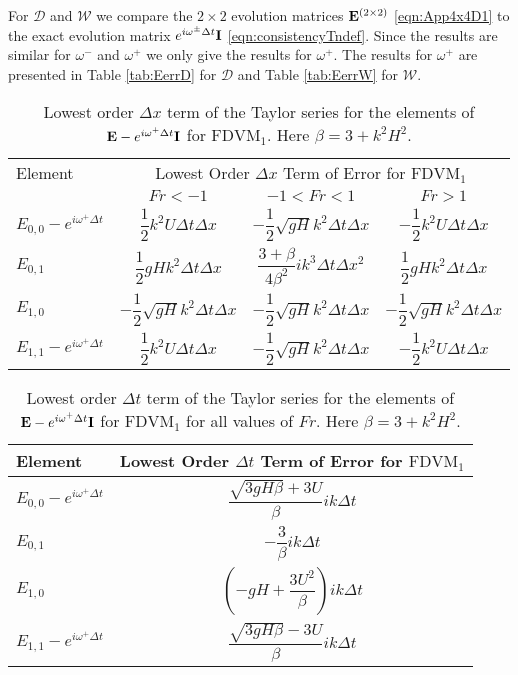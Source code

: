 For $\mathcal{D}$ and $\mathcal{W}$ we compare the $2\times 2$ evolution matrices $\mathbf{E}^{\left(2\times 2\right)}$ \eqref{eqn:App4x4D1} to the exact evolution matrix $e^{i\omega^\pm \Delta t } \mathbf{I}$ \eqref{eqn:consistencyTndef}. Since the results are similar for $\omega^-$ and $\omega^+$ we only give the results for $\omega^+$. The results for $\omega^+$ are presented in Table \ref{tab:EerrD} for $\mathcal{D}$ and Table \ref{tab:EerrW} for $\mathcal{W}$.

\begin{table}
	\centering
	\begin{tabular}{l c c c}
		\hline
		Element & \multicolumn{3}{c}{Lowest Order $\Delta x$ Term of Error for $\text{FDVM}_1$} \T \B \\ 
		\cline{2-4}
		& $Fr < -1$  & $-1 < Fr < 1$ & $Fr > 1$ \T \B \\ 
		\hline
		$E_{0,0} -  e^{i \omega^+ \Delta t} $& $ \dfrac{1}{2} k^2 U \Delta t \Delta x$& $ - \dfrac{1}{2} \sqrt{gH} k^2 \Delta t\Delta x$ &  $- \dfrac{1}{2} k^2 U \Delta t \Delta x$  \T \B \\
		$E_{0,1}$& $\dfrac{1}{2}gHk^2 \Delta t \Delta x $  &$ \dfrac{3 + \beta}{4 \beta^2}i k^3\Delta  t\Delta x^2$ & $\dfrac{1}{2}gHk^2 \Delta t \Delta x $ \T \B   \\
		$E_{1,0}$& $ - \dfrac{1}{2} \sqrt{gH} k^2 \Delta t\Delta x$  &$ - \dfrac{1}{2} \sqrt{gH} k^2 \Delta t\Delta x$ & $ - \dfrac{1}{2} \sqrt{gH} k^2 \Delta t\Delta x$ \T \B  \\
		$E_{1,1} -  e^{i \omega^+ \Delta t}$& $ \dfrac{1}{2} k^2 U \Delta t \Delta x$  &$ - \dfrac{1}{2} \sqrt{gH} k^2 \Delta t\Delta x$ & $- \dfrac{1}{2} k^2 U \Delta t \Delta x$  \T\B  \\
		\hline
	\end{tabular}
	\caption{Lowest order $\Delta x$ term of the Taylor series for the elements of $\mathbf{E} - e^{i \omega^+ \Delta t} \mathbf{I}$ for $\text{FDVM}_1$. Here $\beta = 3 + k^2 H^2$.}
	\label{tab:EerrFDVM1dxerror} 
\end{table}
\begin{table}
	\centering
	\begin{tabular}{l c}
		\hline 
		Element & \multicolumn{1}{c}{Lowest Order $\Delta t$ Term of Error for $\text{FDVM}_1$}\T\B \\
		\hline 
		$E_{0,0} -  e^{i \omega^+ \Delta t} $ & $\dfrac{\sqrt{3gH \beta} + 3U}{\beta} ik \Delta t$ \T \B \\
		$E_{0,1}$&  $ - \dfrac{3}{\beta} ik\Delta t$ \T \B \\
		$E_{1,0}$&   $ \left(-gH + \dfrac{3U^2}{\beta}\right)ik \Delta t$ \T \B  \\
		$E_{1,1} -  e^{i \omega^+ \Delta t}$& $\dfrac{\sqrt{3gH \beta} - 3U}{\beta} ik \Delta t$ \T \B  \\
		\hline
	\end{tabular}
	\caption{Lowest order $\Delta t$ term of the Taylor series for the elements of $\mathbf{E} - e^{i \omega^+ \Delta t} \mathbf{I}$ for $\text{FDVM}_1$ for all values of $Fr$. Here $\beta = 3 + k^2 H^2$.}
	\label{tab:EerrFDVM1dterror} 
\end{table}
